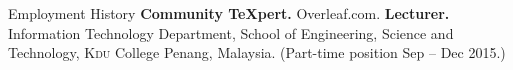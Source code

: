 \begin{rubric}{Employment History}
%
	\textbf{Community \TeX{}pert.} Overleaf.com.
%
%
\entry*[2013 -- 2015]%
	\textbf{Lecturer.} Information Technology Department, School of Engineering, Science and Technology, \textsc{Kdu} College Penang, Malaysia. (Part-time position Sep -- Dec 2015.)
%
\end{rubric}